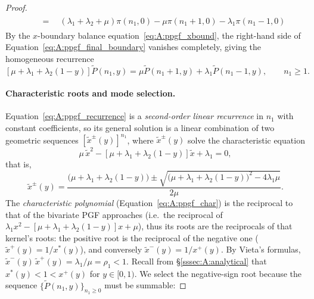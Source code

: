 \begin{proof}
\begin{align}
\begin{split}
            & \quad = \quad (\lambda_1+\lambda_2+\mu)\pi(n_1,0) -\mu\pi(n_1+1,0)-\lambda_1\pi(n_1-1,0)
        \end{split}
        \label{eq:A:ppgf_final_boundary}
    \end{align}
    By the $x$-boundary balance equation~\eqref{eq:A:ppgf_xbound}, the right-hand side of Equation~\eqref{eq:A:ppgf_final_boundary} vanishes completely, giving the homogeneous recurrence
    \begin{equation}
        \left[ \mu + \lambda_1 + \lambda_2 (1-y) \right] \widetilde{P}(n_1,y)
        = \mu \widetilde{P}(n_1+1,y)
        + \lambda_1 \widetilde{P}(n_1-1,y),
        \qquad n_1\geq1.
        \label{eq:A:ppgf_recurrence}
    \end{equation}
    
    \paragraph{Characteristic roots and mode selection.}
    Equation~\eqref{eq:A:ppgf_recurrence} is a \emph{second-order linear recurrence} in $n_1$ with constant coefficients, so its general solution is a linear combination of two geometric sequences $[\widetilde{x}^{\pm}(y)]^{n_1}$, where $\widetilde{x}^{\pm}(y)$ solve the characteristic equation
    \begin{equation}
        \mu\,\widetilde{x}^2 - \left[ \mu + \lambda_1 + \lambda_2(1-y) \right]\widetilde{x} + \lambda_1 = 0,
        \label{eq:A:ppgf_char}
    \end{equation}
    that is,
    \begin{equation*}
        \widetilde{x}^{\pm}(y)
        = \frac{\bigl(\mu + \lambda_1 + \lambda_2(1-y)\bigr)
                \pm \sqrt{\bigl(\mu + \lambda_1 + \lambda_2(1-y)\bigr)^2 - 4\lambda_1\mu}}{2\mu}.
    \end{equation*}
    The \emph{characteristic polynomial} (Equation~\eqref{eq:A:ppgf_char}) is the reciprocal to that of the bivariate PGF approaches (i.e.\ the reciprocal of $\lambda_1 x^2-[\mu+\lambda_1+\lambda_2(1-y)]x+\mu$), thus its roots are the reciprocals of that kernel's roots: the positive root is the reciprocal of the negative one ($\widetilde{x}^{+}(y)=1/x^*(y)$), and conversely $\widetilde{x}^{-}(y)=1/x^{+}(y)$. By Vieta's formulas, $\widetilde{x}^{-}(y)\,\widetilde{x}^{+}(y)=\lambda_1/\mu=\rho_1<1$. Recall from \S\ref{sssec:A:analytical} that $x^*(y)<1<x^{+}(y)$ for $y\in[0,1)$.
    We select the negative-sign root because the sequence $\{\widetilde{P}(n_1,y)\}_{n_1\geq0}$ must be summable:

\end{proof}
